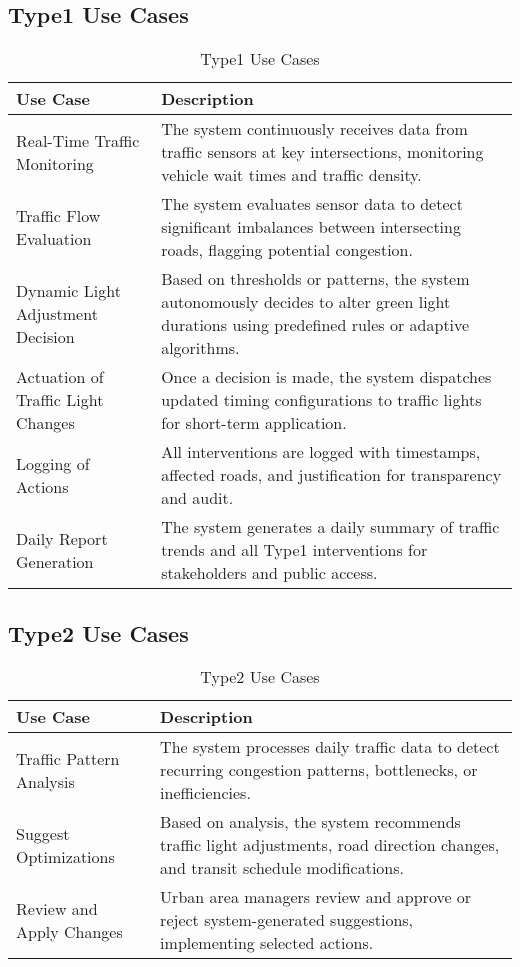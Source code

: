 \documentclass[a4paper,12pt]{article}
\begin{document}
\subsection*{Type1 Use Cases}
\begin{table}[h!]
\centering
\begin{tabular}{|p{4.5cm}|p{8.5cm}|}
\hline
\textbf{Use Case} & \textbf{Description} \\
\hline
Real-Time Traffic Monitoring & The system continuously receives data from traffic sensors at key intersections, monitoring vehicle wait times and traffic density. \\
\hline
Traffic Flow Evaluation & The system evaluates sensor data to detect significant imbalances between intersecting roads, flagging potential congestion. \\
\hline
Dynamic Light Adjustment Decision & Based on thresholds or patterns, the system autonomously decides to alter green light durations using predefined rules or adaptive algorithms. \\
\hline
Actuation of Traffic Light Changes & Once a decision is made, the system dispatches updated timing configurations to traffic lights for short-term application. \\
\hline
Logging of Actions & All interventions are logged with timestamps, affected roads, and justification for transparency and audit. \\
\hline
Daily Report Generation & The system generates a daily summary of traffic trends and all Type1 interventions for stakeholders and public access. \\
\hline
\end{tabular}
\caption{Type1 Use Cases}
\end{table}

\newpage

\subsection*{Type2 Use Cases}
\begin{table}[h!]
\centering
\begin{tabular}{|p{4.5cm}|p{8.5cm}|}
\hline
\textbf{Use Case} & \textbf{Description} \\
\hline
Traffic Pattern Analysis & The system processes daily traffic data to detect recurring congestion patterns, bottlenecks, or inefficiencies. \\
\hline
Suggest Optimizations & Based on analysis, the system recommends traffic light adjustments, road direction changes, and transit schedule modifications. \\
\hline
Review and Apply Changes & Urban area managers review and approve or reject system-generated suggestions, implementing selected actions. \\
\hline
\end{tabular}
\caption{Type2 Use Cases}
\end{table}
\end{document}
